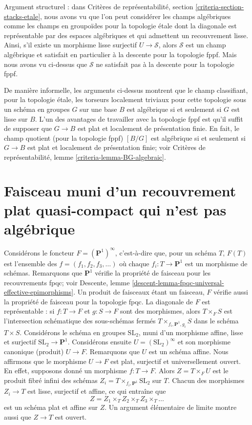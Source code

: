 \medskip\noindent
Argument structurel : dans
Critères de représentabilité, section \ref{criteria-section-stacks-etale},
nous avons vu que l'on peut considérer les champs algébriques comme les
champs en groupoïdes pour la topologie étale dont la diagonale est
représentable par des espaces algébriques et qui admettent un recouvrement lisse.
Ainsi, s'il existe un morphisme lisse surjectif $U \to \mathcal{S}$, alors
$\mathcal{S}$ est un champ algébrique et satisfait en particulier à la
descente pour la topologie fppf. Mais nous avons vu ci-dessus que $\mathcal{S}$
ne satisfait pas à la descente pour la topologie fppf.

\medskip\noindent
De manière informelle, les arguments ci-dessus montrent que le champ classifiant,
pour la topologie étale, les torseurs localement triviaux pour cette topologie
sous un schéma en groupes $G$ sur une base $B$ est algébrique si et seulement
si $G$ est lisse sur $B$. L'un des avantages de travailler avec
la topologie fppf est qu'il suffit de supposer que $G \to B$
est plat et localement de présentation finie. En fait, le champ quotient
(pour la topologie fppf) $[B/G]$ est algébrique si et seulement
si $G \to B$ est plat et localement de présentation finie; voir
Critères de représentabilité, lemme \ref{criteria-lemma-BG-algebraic}.







\section{Faisceau muni d'un recouvrement plat quasi-compact qui n'est pas algébrique}
\label{section-not-algebraic}

\noindent
Considérons le foncteur $F = (\mathbf{P}^1)^\infty$, c'est-à-dire que, pour un schéma $T$,
$F(T)$ est l'ensemble des $f = (f_1, f_2, f_3, \ldots)$ où chaque
$f_i : T \to \mathbf{P}^1$ est un morphisme de schémas. Remarquons que
$\mathbf{P}^1$ vérifie la propriété de faisceau pour les recouvrements fpqc; voir
Descente, lemme \ref{descent-lemma-fpqc-universal-effective-epimorphisms}.
Un produit de faisceaux étant un faisceau, $F$ vérifie aussi la propriété de faisceau pour
la topologie fpqc. La diagonale de $F$ est représentable : si $f : T \to F$
et $g : S \to F$ sont des morphismes, alors $T \times_F S$ est l'intersection schématique
des sous-schémas fermés $T \times_{f_i, \mathbf{P}^1, g_i} S$
dans le schéma $T \times S$. Considérons le schéma en groupes $\text{SL}_2$, muni
d'un morphisme affine, lisse et surjectif $\text{SL}_2 \to \mathbf{P}^1$.
Considérons ensuite $U = (\text{SL}_2)^\infty$ et son morphisme canonique (produit)
$U \to F$. Remarquons que $U$ est un schéma affine. Nous affirmons que le morphisme
$U \to F$ est plat, surjectif et universellement ouvert. En effet, supposons donné
un morphisme $f : T \to F$. Alors $Z = T \times_F U$ est le produit fibré infini
des schémas $Z_i = T \times_{f_i, \mathbf{P}^1} \text{SL}_2$
sur $T$. Chacun des morphismes $Z_i \to T$ est lisse, surjectif et
affine, ce qui entraîne que
$$
Z = Z_1 \times_T Z_2 \times_T Z_3 \times_T \ldots
$$
est un schéma plat et affine sur $Z$. Un argument élémentaire de limite montre aussi que
$Z \to T$ est ouvert.

